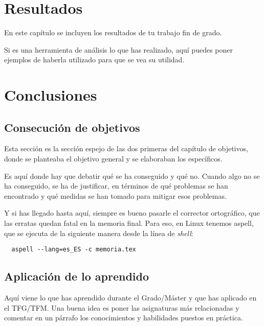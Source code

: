 \documentclass[a4paper, 12pt]{book}
\begin{document}
\cleardoublepage
\chapter{Resultados}

En este capítulo se incluyen los resultados de tu trabajo fin de grado.

Si es una herramienta de análisis lo que has realizado, aquí puedes poner ejemplos de haberla utilizado para que se vea su utilidad.



\cleardoublepage
\chapter{Conclusiones}
\label{chap:conclusiones}


\section{Consecución de objetivos}
\label{sec:consecucion-objetivos}

Esta sección es la sección espejo de las dos primeras del capítulo de objetivos, donde se planteaba el objetivo general y se elaboraban los específicos.

Es aquí donde hay que debatir qué se ha conseguido y qué no. 
Cuando algo no se ha conseguido, se ha de justificar, en términos de qué problemas se han encontrado y qué medidas se han tomado para mitigar esos problemas.

Y si has llegado hasta aquí, siempre es bueno pasarle el corrector ortográfico, que las erratas quedan fatal en la memoria final.
Para eso, en Linux tenemos aspell, que se ejecuta de la siguiente manera desde la línea de \emph{shell}:

\begin{verbatim}
  aspell --lang=es_ES -c memoria.tex
\end{verbatim}

\section{Aplicación de lo aprendido}
\label{sec:aplicacion}

Aquí viene lo que has aprendido durante el Grado/Máster y que has aplicado en el TFG/TFM. Una buena idea es poner las asignaturas más relacionadas y comentar en un párrafo los conocimientos y habilidades puestos en práctica.
\end{document}
